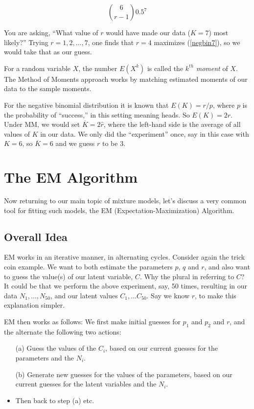 \begin{equation}
\label{negbin7}
\binom{6}{r-1} 0.5^7
\end{equation}

You are asking, ``What value of $r$ would have made our data ($K = 7$)
most likely?''  Trying $r = 1,2,...,7$, one finds that $r = 4$ maximizes
(\ref{negbin7}), so we would take that as our guess.

For a random variable $X$, the number $E(X^k)$ is called the $k^{th}$
\textit{moment} of $X$.  The Method of Moments approach works by
matching estimated moments of our data to the sample moments.

For the negative binomial distribution it is known that $E(K) = r/p$,
where $p$ is the probability of ``success,'' in this setting meaning
heads.  So $E(K) = 2r$.  Under MM, we would set $\overline{K} = 2
\widehat{r}$, where the left-hand side is the average of all values of
$K$ in our data.  We only did the ``experiment'' once, say in this case
with $K = 6$, so $\overline{K} = 6$ and we guess $r$ to be 3.

\section{The EM Algorithm}
\label{emalg}

Now returning to our main topic of mixture models, let's discuss a very
common tool for fitting such models, the EM (Expectation-Maximization)
Algorithm.  

\subsection{Overall Idea}

EM works in an iterative manner, in alternating cycles.  Consider again
the trick coin example.  We want to both estimate the parameters $p$,
$q$ and $r$, and also want to guess the value(s) of our latent variable,
$C$.  Why the plural in referring to $C$?  It could be that we perform
the above experiment, say, 50 times, resulting in our data
$N_1,...,N_{50}$, and our latent values $C_1,...C_{50}$.  
Say we know $r$, to make this explanation simpler.

EM then works as follows:  We first make initial guesses for $p_1$ and $p_2$
and $r$, and the alternate the following two actions:

\begin{itemize}

\item[(a)] Guess the values of the $C_i$, based on our current guesses for
the parameters and the $N_i$.

\item[(b)] Generate new guesses for the values of the parameters, based on
our current guesses for the latent variables and the $N_i$.

\item Then back to step (a) etc.

\end{itemize} 

